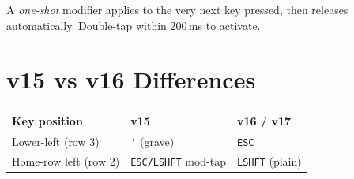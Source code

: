 \documentclass[11pt, letterpaper]{article}
\begin{document}
A \emph{one-shot} modifier applies to the very next key pressed, then
releases automatically. Double-tap within 200\,ms to activate.

\section{v15 vs v16 Differences}

\begin{tabular}{lll}
\toprule
\textbf{Key position}  & \textbf{v15}              & \textbf{v16 / v17} \\
\midrule
Lower-left (row 3)     & \texttt{`} (grave)        & \texttt{ESC} \\
Home-row left (row 2)  & \texttt{ESC/LSHFT} mod-tap & \texttt{LSHFT} (plain) \\
\bottomrule
\end{tabular}
\end{document}
